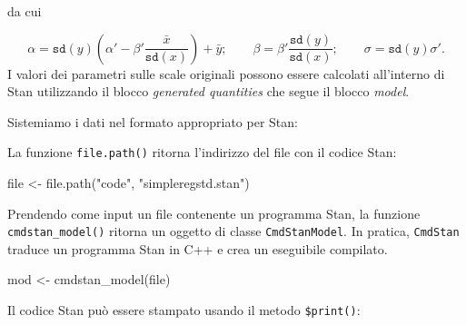 \documentclass[
]{memoir}
\newenvironment{Shaded}{\begin{snugshade}}{\end{snugshade}}
\newcommand{\AttributeTok}[1]{\textcolor[rgb]{0.77,0.63,0.00}{#1}}
\newcommand{\FunctionTok}[1]{\textcolor[rgb]{0.00,0.00,0.00}{#1}}
\newcommand{\NormalTok}[1]{#1}
\newcommand{\OtherTok}[1]{\textcolor[rgb]{0.56,0.35,0.01}{#1}}
\newcommand{\SpecialCharTok}[1]{\textcolor[rgb]{0.00,0.00,0.00}{#1}}
\newcommand{\StringTok}[1]{\textcolor[rgb]{0.31,0.60,0.02}{#1}}
\begin{document}
\noindent
da cui

\[
\alpha
=
\texttt{sd}(y)
      \left(
          \alpha'
          - \beta' \frac{\bar{x}}{\texttt{sd}(x)}
      \right)
  + \bar{y};
\qquad
\beta = \beta' \frac{\texttt{sd}(y)}{\texttt{sd}(x)};
\qquad
\sigma = \texttt{sd}(y) \sigma'.
\]
\noindent
I valori dei parametri sulle scale originali possono essere calcolati all'interno di Stan utilizzando il blocco \emph{generated quantities} che segue il blocco \emph{model}.

\noindent
Sistemiamo i dati nel formato appropriato per Stan:

\begin{Shaded}
\end{Shaded}

\noindent
La funzione \texttt{file.path()} ritorna l'indirizzo del file con il codice Stan:

\begin{Shaded}
\begin{Highlighting}[]
\NormalTok{file }\OtherTok{\textless{}{-}} \FunctionTok{file.path}\NormalTok{(}\StringTok{"code"}\NormalTok{, }\StringTok{"simpleregstd.stan"}\NormalTok{)}
\end{Highlighting}
\end{Shaded}

\noindent
Prendendo come input un file contenente un programma Stan, la funzione \texttt{cmdstan\_model()} ritorna un oggetto di classe \texttt{CmdStanModel}. In pratica, \texttt{CmdStan} traduce un programma Stan in C++ e crea un eseguibile compilato.

\begin{Shaded}
\begin{Highlighting}[]
\NormalTok{mod }\OtherTok{\textless{}{-}} \FunctionTok{cmdstan\_model}\NormalTok{(file)}
\end{Highlighting}
\end{Shaded}

\noindent
Il codice Stan può essere stampato usando il metodo \texttt{\$print()}:
\end{document}
